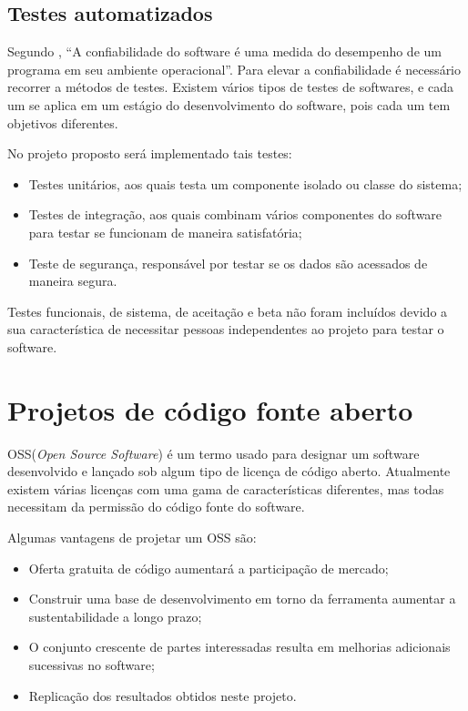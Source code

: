 
\subsection{Testes automatizados}

Segundo \cite{mathur1991performance}, “A confiabilidade do software é uma medida do desempenho de um programa em seu ambiente operacional”. Para elevar a confiabilidade é necessário recorrer a métodos de testes. Existem vários tipos de testes de softwares, e cada um se aplica em um estágio do desenvolvimento do software, pois cada um tem objetivos diferentes\cite{nidhra2012black}. \par
No projeto proposto será implementado tais testes: \par
\begin{itemize}
\item Testes unitários, aos quais testa um componente isolado ou classe do sistema;
\item Testes de integração, aos quais combinam vários componentes do software para testar se funcionam de maneira satisfatória;
\item Teste de segurança, responsável por testar se os dados são acessados de maneira segura.
\end{itemize}
Testes funcionais, de sistema, de aceitação e beta não foram incluídos devido a sua característica de necessitar pessoas independentes ao projeto para testar o software.


\section{Projetos de código fonte aberto}

OSS(\textit{Open Source Software}) é um termo usado para designar um software desenvolvido e lançado sob algum tipo de licença de código aberto. Atualmente existem várias licenças com uma gama de características diferentes, mas todas necessitam da permissão do código fonte do software\cite{crowston2003defining}.

Algumas vantagens de projetar um OSS são:
\begin{itemize}  
\item Oferta gratuita de código aumentará a participação de mercado\cite{fitzgerald2006transformation};
\item Construir uma base de desenvolvimento em torno da ferramenta aumentar a sustentabilidade a longo prazo\cite{nyman2011forking};
\item O conjunto crescente de partes interessadas resulta em melhorias adicionais sucessivas no software\cite{heron2013open};
\item Replicação dos resultados obtidos neste projeto.
\end{itemize}


